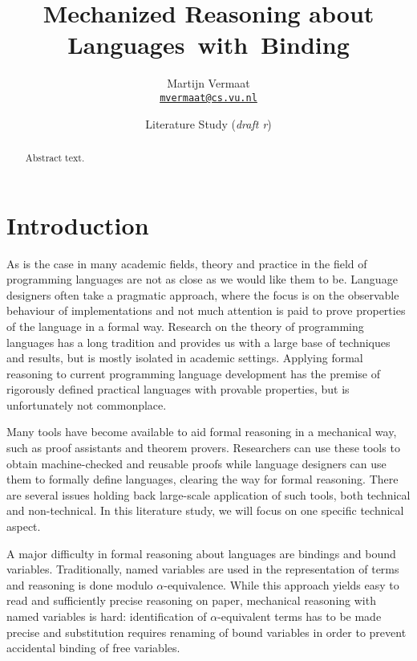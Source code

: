 \documentclass[a4paper,11pt]{article}
\title{Mechanized Reasoning about Languages~with~Binding}
\author{
  Martijn Vermaat\\[0.3em]
  \href{mailto:mvermaat@cs.vu.nl}{\texttt{mvermaat@cs.vu.nl}}
}
\date{Literature Study (\emph{draft r\svnrev})}
\begin{document}
\maketitle


\begin{abstract}
  Abstract text.
\end{abstract}


\section{Introduction}\label{sec:introduction}


As is the case in many academic fields, theory and practice in the field
of programming languages are not as close as we would like them to be.
Language designers often take a pragmatic approach, where the focus is
on the observable behaviour of implementations and not much attention
is paid to prove properties of the language in a formal way.
Research on the theory of programming languages has a long tradition and
provides us with a large base of techniques and results, but is mostly
isolated in academic settings.
Applying formal reasoning to current programming language development
has the premise of rigorously defined practical languages with provable
properties, but is unfortunately not commonplace.

Many tools have become available to aid formal reasoning in a mechanical
way, such as proof assistants and theorem provers.
Researchers can use these tools to obtain machine-checked and reusable
proofs while language designers can use them to formally define languages,
clearing the way for formal reasoning.
There are several issues holding back large-scale application of such
tools, both technical and non-technical. In this literature study, we will
focus on one specific technical aspect.

A major difficulty in formal reasoning about languages are bindings and
bound variables.
Traditionally, named variables are used in the representation of terms
and reasoning is done modulo $\alpha$-equivalence.
While this approach yields easy to read and sufficiently precise
reasoning on paper,
mechanical reasoning with named variables is hard:
identification of $\alpha$-equivalent terms has to be made precise and
substitution requires renaming of bound variables in order to prevent
accidental binding of free variables.
\end{document}
